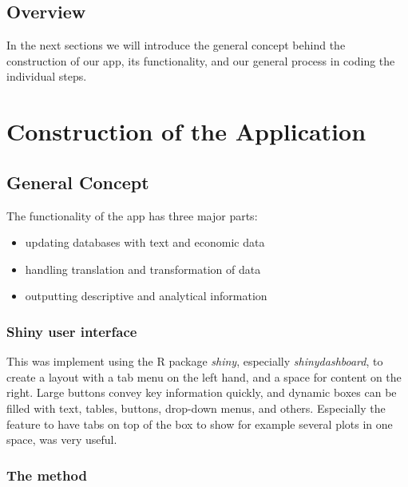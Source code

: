 \documentclass[12pt,a4paper]{article}
\begin{document}
\hypertarget{overview}{%
\subsection{Overview}\label{overview}}

In the next sections we will introduce the general concept behind the construction of our app, its functionality, and our general process in coding the individual steps.

\hypertarget{construction-of-the-application}{%
\section{Construction of the Application}\label{construction-of-the-application}}

\hypertarget{general-concept}{%
\subsection{General Concept}\label{general-concept}}

The functionality of the app has three major parts:

\begin{itemize}
\tightlist
\item
  updating databases with text and economic data
\item
  handling translation and transformation of data
\item
  outputting descriptive and analytical information
\end{itemize}

\hypertarget{shiny-user-interface}{%
\subsubsection{Shiny user interface}\label{shiny-user-interface}}

This was implement using the R package \emph{shiny}, especially \emph{shinydashboard}, to create a layout with a tab menu on the left hand, and a space for content on the right. Large buttons convey key information quickly, and dynamic boxes can be filled with text, tables, buttons, drop-down menus, and others. Especially the feature to have tabs on top of the box to show for example several plots in one space, was very useful.

\hypertarget{the-method}{%
\subsubsection{The method}\label{the-method}}
\end{document}
